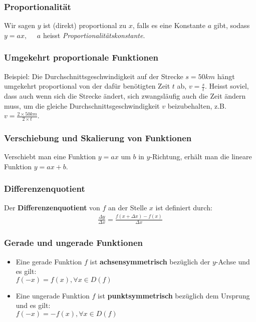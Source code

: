 \subsubsection{Proportionalität}Wir sagen $y$ ist (direkt) proportional zu $x$, falls es eine Konstante $a$ gibt, sodass\\
$y=ax,\quad$ $a$ heisst \textsl{Proportionalitätskonstante}.

\subsubsection{Umgekehrt proportionale Funktionen}Beispiel: Die Durchschnittsgeschwindigkeit auf der Strecke $s=50km$ hängt umgekehrt proportional von der dafür benötigten Zeit $t$ ab, $v=\frac{s}{t}$. Heisst soviel, dass auch wenn sich die Strecke ändert, sich zwangsläufig auch die Zeit ändern muss, um die gleiche Durchschnittsgeschwindigkeit $v$ beizubehalten, z.B. $v=\frac{2\times 50km}{2\times t}$.

\subsubsection{Verschiebung und Skalierung von Funktionen}Verschiebt man eine Funktion $y=ax$ um $b$ in $y$-Richtung, erhält man die lineare Funktion $y=ax+b$.

\subsubsection{Differenzenquotient}Der \textbf{Differenzenquotient} von $f$ an der Stelle $x$ ist definiert durch:
\begin{align*}
    \frac{\Delta y}{\Delta x}=\frac{f(x+\Delta x)-f(x)}{\Delta x}
\end{align*}

\subsubsection{Gerade und ungerade Funktionen}
\begin{itemize}
    \item Eine gerade Funktion $f$ ist \textbf{achsensymmetrisch} bezüglich der $y$-Achse und es gilt:\\$f(-x)=f(x),\forall x \in D(f)$
    \item Eine ungerade Funktion $f$ ist \textbf{punktsymmetrisch} bezüglich dem Ursprung und es gilt:\\$f(-x)=-f(x),\forall x \in D(f)$
\end{itemize}
